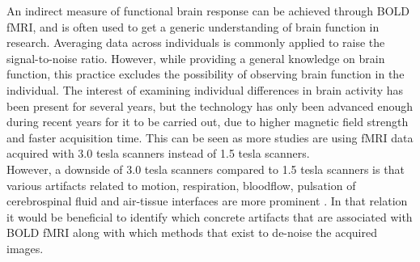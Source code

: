 An indirect measure of functional brain response can be achieved through BOLD fMRI, and is often used to get a generic understanding of brain function in research. Averaging data across individuals is commonly applied to raise the signal-to-noise ratio. However, while providing a general knowledge on brain function, this practice excludes the possibility of observing brain function in the individual. The interest of examining individual differences in brain activity has been present for several years, but the technology has only been advanced enough during recent years for it to be carried out, due to higher magnetic field strength and faster acquisition time. This can be seen as more studies are using fMRI data acquired with 3.0 tesla scanners instead of 1.5 tesla scanners. \cite{Dubois2016} \\
However, a downside of 3.0 tesla scanners compared to 1.5 tesla scanners is that various artifacts related to motion, respiration, bloodflow, pulsation of cerebrospinal fluid and air-tissue interfaces are more prominent \cite{Wood2012}. In that relation it would be beneficial to identify which concrete artifacts that are associated with BOLD fMRI along with which methods that exist to de-noise the acquired images.   
